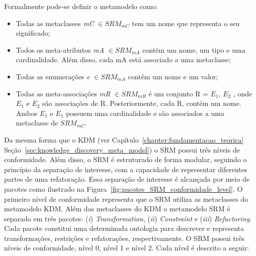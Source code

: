 Formalmente pode-se definir o metamodelo como:

\begin{itemize}
	\item Todas as metaclasses \textit{mC} $\in SRM_{mC}$ tem um nome que representa o seu significado;
	\item Todos os meta-atributos \textit{mA} $\in SRM_{mA}$ contêm um nome, um tipo e uma cardinalidade. Além disso, cada mA está associado a uma metaclasse;
	\item Todas as enumerações \textit{e} $\in SRM_{mA}$ contêm um nome e um valor;
	\item Todas as meta-associações \textit{mR} $\in SRM_{mR}$ é um conjunto R = $E_{1}$, $E_{2}$  , onde  $E_{1}$ e $E_{2}$ são associações de R. Posteriormente, cada R, contém um nome. Ambos $E_{1}$  e $E_{1}$ possuem uma cardinalidade e são associados a uma metaclasse de $SRM_{mC}$.
\end{itemize}

Da mesma forma que o KDM (ver Capítulo~\ref{chapter:fundamentacao_teorica} Seção~\ref{sec:knowledge_discovery_meta_model}) o SRM possui três níveis de conformidade. Além disso, o SRM é estruturado de forma modular, seguindo o princípio da separação de interesse, com a capacidade de representar diferentes partes de uma refatoração. Essa separação de interesse é alcançada por meio de pacotes como ilustrado na Figura~\ref{fig:pacotes_SRM_conformidade_level}. O primeiro nível de conformidade representa que o SRM utiliza as metaclasses do metamodelo KDM. Além das metaclasses do KDM o metamodelo SRM é separado em três pacotes: (\textit{i}) \textit{Transformation}, (\textit{ii}) \textit{Constraint} e (\textit{iii}) \textit{Refactoring}. Cada pacote constitui uma determinada ontologia para descrever e representa transformações, restrições e refatorações, respectivamente. O SRM possui três níveis de conformidade, nível 0, nível 1 e nível 2. Cada nível é descrito a seguir:

